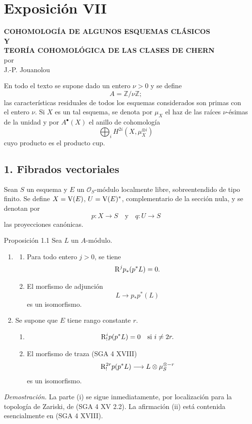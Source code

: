 \section*{Exposición VII}

\begin{center}
\textbf{COHOMOLOGÍA DE ALGUNOS ESQUEMAS CLÁSICOS}\\[0.5em]
\textbf{Y}\\[0.5em]
\textbf{TEORÍA COHOMOLÓGICA DE LAS CLASES DE CHERN}\\[1em]
por\\[0.5em]
J.-P. Jouanolou
\end{center}

En todo el texto se supone dado un entero $\nu>0$ y se define
\[
A=\mathbb Z/\nu\mathbb Z;
\]
las características residuales de todos los esquemas considerados son primas con el entero $\nu$. Si $X$ es un tal esquema, se denota por $\mu_X$ el haz de las raíces $\nu$-ésimas de la unidad y por $A^{\bullet}(X)$ el anillo de cohomología
\[
\bigoplus_i H^{2i}(X,\mu_X^{\otimes i})
\]
cuyo producto es el producto cup.

\subsection*{1. Fibrados vectoriales}

Sean $S$ un esquema y $E$ un $\mathcal O_S$-módulo localmente libre, sobreentendido de tipo finito. Se define $X=\mathrm V(E)$, $U=\mathrm V(E)^*$, complementario de la sección nula, y se denotan por
\[
p:X\to S
\quad\text{y}\quad
q:U\to S
\]
las proyecciones canónicas.

\begin{statement}{Proposición 1.1}
Sea $L$ un $A$-módulo.
\begin{enumerate}[label=(\roman*)]
\item
\begin{enumerate}[label=\alph*)]
\item Para todo entero $j>0$, se tiene
\[
\mathrm{R}^j p_*(p^*L)=0.
\]
\item El morfismo de adjunción
\[
L\longrightarrow p_*p^*(L)
\]
es un isomorfismo.
\end{enumerate}
\item Se supone que $E$ tiene rango constante $r$.
\begin{enumerate}[label=\alph*)]
\item
\[
\mathrm{R}_!^i p(p^*L)=0\quad\text{si }i\ne 2r.
\]
\item El morfismo de traza (SGA 4 XVIII)
\[
\mathrm{R}_!^{2r}p(p^*L)\longrightarrow L\otimes\mu_S^{\otimes -r}
\]
es un isomorfismo.
\end{enumerate}
\end{enumerate}
\end{statement}

\emph{Demostración.} La parte (i) se sigue inmediatamente, por localización para la topología de Zariski, de (SGA 4 XV 2.2). La afirmación (ii) está contenida esencialmente en (SGA 4 XVIII).
